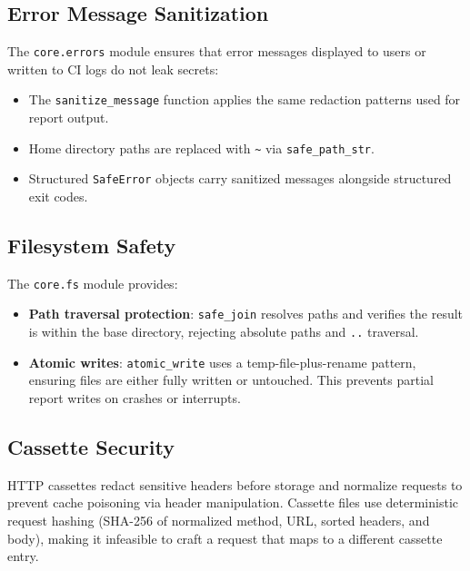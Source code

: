 \documentclass[11pt,a4paper]{article}
\begin{document}
\subsection{Error Message Sanitization}

The \texttt{core.errors} module ensures that error messages displayed to
users or written to CI logs do not leak secrets:

\begin{itemize}[nosep]
  \item The \texttt{sanitize\_message} function applies the same
        redaction patterns used for report output.
  \item Home directory paths are replaced with \texttt{\textasciitilde}
        via \texttt{safe\_path\_str}.
  \item Structured \texttt{SafeError} objects carry sanitized messages
        alongside structured exit codes.
\end{itemize}

\subsection{Filesystem Safety}

The \texttt{core.fs} module provides:

\begin{itemize}[nosep]
  \item \textbf{Path traversal protection}: \texttt{safe\_join} resolves
        paths and verifies the result is within the base directory,
        rejecting absolute paths and \texttt{..} traversal.
  \item \textbf{Atomic writes}: \texttt{atomic\_write} uses a
        temp-file-plus-rename pattern, ensuring files are either fully
        written or untouched. This prevents partial report writes on
        crashes or interrupts.
\end{itemize}

\subsection{Cassette Security}

HTTP cassettes redact sensitive headers before storage and normalize
requests to prevent cache poisoning via header manipulation. Cassette
files use deterministic request hashing (SHA-256 of normalized method,
URL, sorted headers, and body), making it infeasible to craft a request
that maps to a different cassette entry.

\end{document}

